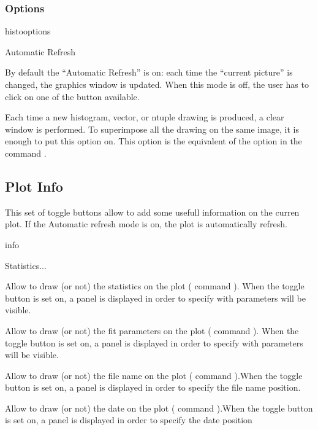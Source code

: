 \subsubsection{Options}

\begin{PAWf}{histooptions}
\begin{DLsf}{Automatic Refresh}
\item[Automatic Refresh] By default the ``Automatic Refresh'' is on: each
                         time the ``current picture'' is changed, the graphics
                         window is updated. When this mode is off, the user
                         has to click on one of the  button
                         available. 
\item[Overlay] Each time a new histogram, vector, or ntuple drawing is
               produced, a clear window is performed. To superimpose
               all the drawing on the same image, it is enough to put this
               option on. This option is the equivalent of the option
                in the command .
\end{DLsf}
\end{PAWf}

\newpage

\subsection{Plot Info}
This set of toggle buttons allow to add some usefull information on the
curren plot. If the Automatic refresh mode is on, the plot is automatically
refresh.

\begin{PAWf}{info}
\begin{DLsf}{Statistics...}
\item[Statistics...]  Allow to draw (or not) the statistics on the plot
                      (\XPAW{} command ). When the toggle
                      button is set on, a panel is displayed in order to
                      specify with parameters will be visible.
\item[Fits...]        Allow to draw (or not) the fit parameters on the plot
                      (\XPAW{} command ). When the toggle
                      button is set on, a panel is displayed in order to
                      specify with parameters will be visible.
\item[File Name...]   Allow to draw (or not) the file name on the plot
                      (\XPAW{} command ).When the toggle
                      button is set on, a panel is displayed in order to
                      specify the file name position.
\item[Date...]        Allow to draw (or not) the date on the plot
                      (\XPAW{} command ).When the toggle
                      button is set on, a panel is displayed in order to
                      specify the date position
\end{DLsf}
\end{PAWf}


